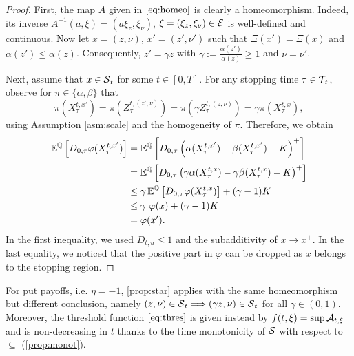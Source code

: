 \begin{proof}
First, the map $A$ given in $\eqref{eq:homeo}$ is clearly a homeomorphism. Indeed, its inverse $A^{-1}(a,\xi) = (a \xi_z,\xi_\nu)$, $\xi = (\xi_z,\xi_\nu) \in \operatorname{\mathcal{E}}$ is well-defined and continuous. Now let  $x = (z,\nu)$, $x' =(z',\nu')$  such that $\Xi(x')=\Xi(x)$ and $\alpha(z') \le \alpha(z)$. Consequently,   $z'= \gamma z$ with $\gamma := \frac{\alpha(z')}{\alpha(z)} \ge 1$ and $\nu = \nu'$. 

Next, assume that $x\in \operatorname{\mathcal{S}}_t$ for some $t\in [0,T]$. For any  stopping time $\tau \in \operatorname{\mathcal{T}}_{\!t}$, observe for $\pi \in \{\alpha,\beta\}$ that 
$$\pi(X^{t,x'}_{\tau})=\pi(Z^{t,(z',\nu)}_{\tau})=\pi(\gamma Z^{t,(z,\nu)}_{\tau})=\gamma \pi(X^{t,x}_{\tau}), $$ 
using Assumption \ref{asm:scale} and the homogeneity of $\pi$.
Therefore, we obtain
\begin{align*}
    \operatorname{\mathbb{E}}^{\operatorname{\mathbb{Q}}}\left[ D_{0,\tau} \varphi(X^{t,x'}_{\tau})\right] &= \operatorname{\mathbb{E}}^{\operatorname{\mathbb{Q}}}\left[ D_{0,\tau} \left(\alpha(X^{t,x'}_{\tau}) -\beta(X^{t,x'}_{\tau}) -K\right)^+ \right]\\
    &= \operatorname{\mathbb{E}}^{\operatorname{\mathbb{Q}}}\left[ D_{0,\tau} \left(\gamma \alpha(X^{t,x}_{\tau}) -\gamma \beta(X^{t,x}_{\tau}) -K\right)^+ \right]\\
   &\le \gamma \operatorname{\mathbb{E}}^{\operatorname{\mathbb{Q}}}\left[ D_{0,\tau} \varphi(X^{t,x}_{\tau}) \right] + (\gamma  - 1)K\\
   &\le \gamma \ \varphi(x) + (\gamma  - 1)K\\
   &= \varphi(x').
\end{align*}
In the first inequality, we used  $D_{t,u} \le 1$ and the subadditivity of $x \to x^+$. In the last equality, we noticed that the positive part  in $\varphi$ can be dropped as $x$ belongs to the  stopping region. %

\end{proof}

\begin{remark}
For put payoffs, i.e. $\eta =-1$,  \cref{prop:star} applies with the same homeomorphism but different conclusion, namely  $(z,\nu)\in \operatorname{\mathcal{S}}_t \Longrightarrow (\gamma z,\nu) \in \operatorname{\mathcal{S}}_t$ for all $\gamma \in (0,1)$. Moreover, the threshold function $\eqref{eq:thres}$ is given instead by 
$f(t,\xi) = \sup \operatorname{\mathcal{A}}_{t,\xi}$ and is  non-decreasing in $t$  thanks to the time  monotonicity of $\operatorname{\mathcal{S}}$ with respect to  $\subseteq$ (\cref{prop:monot}). 
\end{remark}


